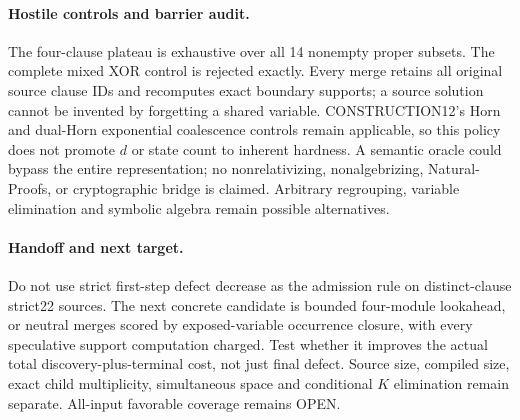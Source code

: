 \documentclass[11pt]{article}
\begin{document}
\paragraph{Hostile controls and barrier audit.}
The four-clause plateau is exhaustive over all 14 nonempty proper subsets.
The complete mixed XOR control is rejected exactly. Every merge retains
all original source clause IDs and recomputes exact boundary supports;
a source solution cannot be invented by forgetting a shared variable.
CONSTRUCTION12's Horn and dual-Horn exponential coalescence controls remain
applicable, so this policy does not promote $d$ or state count to inherent
hardness. A semantic oracle could bypass the entire representation;
no nonrelativizing, nonalgebrizing, Natural-Proofs, or cryptographic bridge
is claimed. Arbitrary regrouping, variable elimination and symbolic algebra
remain possible alternatives.

\paragraph{Handoff and next target.}
Do not use strict first-step defect decrease as the admission rule on
distinct-clause strict22 sources. The next concrete candidate is bounded
four-module lookahead, or neutral merges scored by exposed-variable
occurrence closure, with every speculative support computation charged.
Test whether it improves the actual total discovery-plus-terminal cost,
not just final defect. Source size, compiled size, exact child multiplicity,
simultaneous space and conditional $K$ elimination remain separate.
All-input favorable coverage remains OPEN.



\end{document}
